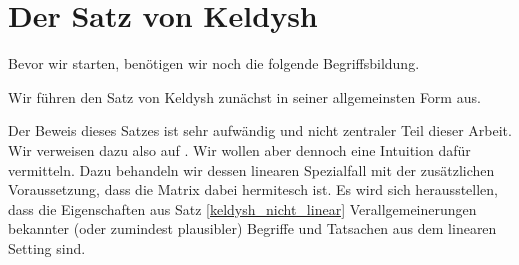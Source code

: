 \section{Der Satz von Keldysh}

Bevor wir starten, benötigen wir noch die folgende Begriffsbildung.



Wir führen den Satz von Keldysh zunächst in seiner allgemeinsten Form aus.



Der Beweis dieses Satzes ist sehr aufwändig und nicht zentraler Teil dieser Arbeit.
Wir verweisen dazu also auf \cite{BEYN20123839}.
Wir wollen aber dennoch eine Intuition dafür vermitteln.
Dazu behandeln wir dessen linearen Spezialfall mit der zusätzlichen Voraussetzung, dass
die Matrix dabei hermitesch ist.
Es wird sich herausstellen, dass die Eigenschaften aus Satz \ref{keldysh_nicht_linear} Verallgemeinerungen bekannter (oder zumindest plausibler) Begriffe und Tatsachen aus dem linearen Setting sind.






% 
% 


